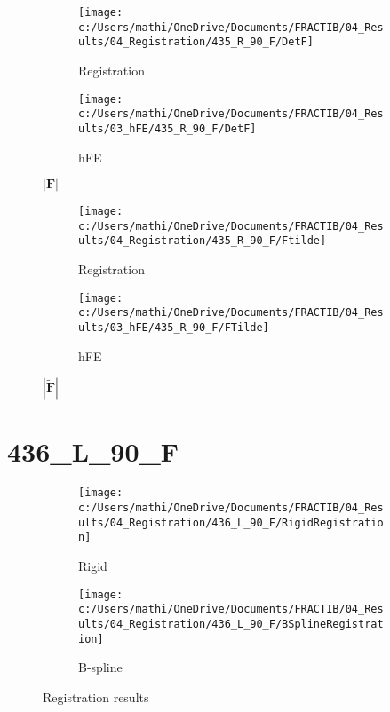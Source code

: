 \documentclass{article}%
\begin{document}
%


\begin{figure}[h!]%
\begin{subfigure}[b]{0.5\linewidth}%
\texttt{[image: c:/Users/mathi/OneDrive/Documents/FRACTIB/04\_Results/04\_Registration/435\_R\_90\_F/DetF]}%
\caption{Registration}%
\end{subfigure}%
\begin{subfigure}[b]{0.5\linewidth}%
\texttt{[image: c:/Users/mathi/OneDrive/Documents/FRACTIB/04\_Results/03\_hFE/435\_R\_90\_F/DetF]}%
\caption{hFE}%
\end{subfigure}%
\caption{$|\mathbf{F}|$}%
\end{figure}

%


\begin{figure}[h!]%
\begin{subfigure}[b]{0.5\linewidth}%
\texttt{[image: c:/Users/mathi/OneDrive/Documents/FRACTIB/04\_Results/04\_Registration/435\_R\_90\_F/Ftilde]}%
\caption{Registration}%
\end{subfigure}%
\begin{subfigure}[b]{0.5\linewidth}%
\texttt{[image: c:/Users/mathi/OneDrive/Documents/FRACTIB/04\_Results/03\_hFE/435\_R\_90\_F/FTilde]}%
\caption{hFE}%
\end{subfigure}%
\caption{$|\widetilde{\mathbf{F}}|$}%
\end{figure}

%
\newpage%
\section*{436\_L\_90\_F}%
\label{sec:436L90F}%


\begin{figure}[h!]%
\begin{subfigure}[b]{0.5\linewidth}%
\texttt{[image: c:/Users/mathi/OneDrive/Documents/FRACTIB/04\_Results/04\_Registration/436\_L\_90\_F/RigidRegistration]}%
\caption{Rigid}%
\end{subfigure}%
\begin{subfigure}[b]{0.5\linewidth}%
\texttt{[image: c:/Users/mathi/OneDrive/Documents/FRACTIB/04\_Results/04\_Registration/436\_L\_90\_F/BSplineRegistration]}%
\caption{B{-}spline}%
\end{subfigure}%
\caption{Registration results}%
\end{figure}

%
\end{document}
